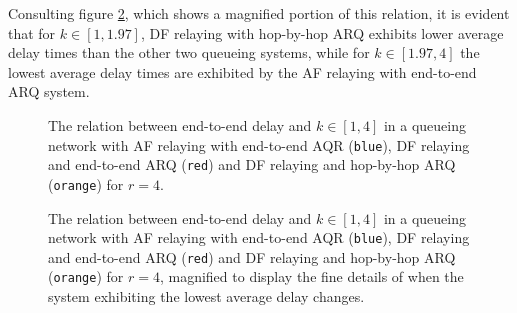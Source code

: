 Consulting figure \ref{fig:06_delay_3}, which shows a magnified portion of this
relation, it is evident that for $k \in [1, 1.97]$, DF relaying with hop-by-hop
ARQ exhibits lower average delay times than the other two queueing systems,
while for $k \in [1.97, 4]$ the lowest average delay times are exhibited by
the AF relaying with end-to-end ARQ system.

\begin{figure}[H]\centering
  
  \caption{The relation between end-to-end delay and $k \in [1,4]$
    in a queueing network with AF relaying with end-to-end AQR (\texttt{blue}),
    DF relaying and end-to-end ARQ (\texttt{red}) and
    DF relaying and hop-by-hop ARQ (\texttt{orange}) for $r=4$.}
  \label{fig:06_delay_2}
\end{figure}

\begin{figure}[H]\centering
  
  \caption{The relation between end-to-end delay and $k \in [1,4]$
    in a queueing network with AF relaying with end-to-end AQR (\texttt{blue}),
    DF relaying and end-to-end ARQ (\texttt{red}) and
    DF relaying and hop-by-hop ARQ (\texttt{orange}) for $r=4$,
    magnified to display the fine details of when the system exhibiting the
    lowest average delay changes.}
  \label{fig:06_delay_3}
\end{figure}
